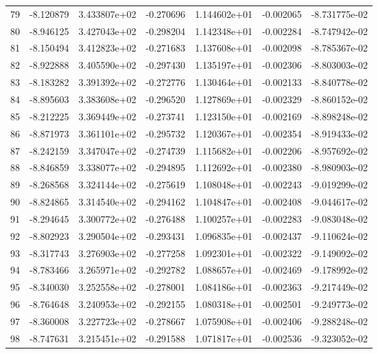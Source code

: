 \begin{tabular}{rrrrrrr}
  79 &  -8.120879 &  3.433807e+02 & -0.270696 &  1.144602e+01 &  -0.002065 & -8.731775e-02 \\
  80 &  -8.946125 &  3.427043e+02 & -0.298204 &  1.142348e+01 &  -0.002284 & -8.747942e-02 \\
  81 &  -8.150494 &  3.412823e+02 & -0.271683 &  1.137608e+01 &  -0.002098 & -8.785367e-02 \\
  82 &  -8.922888 &  3.405590e+02 & -0.297430 &  1.135197e+01 &  -0.002306 & -8.803003e-02 \\
  83 &  -8.183282 &  3.391392e+02 & -0.272776 &  1.130464e+01 &  -0.002133 & -8.840778e-02 \\
  84 &  -8.895603 &  3.383608e+02 & -0.296520 &  1.127869e+01 &  -0.002329 & -8.860152e-02 \\
  85 &  -8.212225 &  3.369449e+02 & -0.273741 &  1.123150e+01 &  -0.002169 & -8.898248e-02 \\
  86 &  -8.871973 &  3.361101e+02 & -0.295732 &  1.120367e+01 &  -0.002354 & -8.919433e-02 \\
  87 &  -8.242159 &  3.347047e+02 & -0.274739 &  1.115682e+01 &  -0.002206 & -8.957692e-02 \\
  88 &  -8.846859 &  3.338077e+02 & -0.294895 &  1.112692e+01 &  -0.002380 & -8.980903e-02 \\
  89 &  -8.268568 &  3.324144e+02 & -0.275619 &  1.108048e+01 &  -0.002243 & -9.019299e-02 \\
  90 &  -8.824865 &  3.314540e+02 & -0.294162 &  1.104847e+01 &  -0.002408 & -9.044617e-02 \\
  91 &  -8.294645 &  3.300772e+02 & -0.276488 &  1.100257e+01 &  -0.002283 & -9.083048e-02 \\
  92 &  -8.802923 &  3.290504e+02 & -0.293431 &  1.096835e+01 &  -0.002437 & -9.110624e-02 \\
  93 &  -8.317743 &  3.276903e+02 & -0.277258 &  1.092301e+01 &  -0.002322 & -9.149092e-02 \\
  94 &  -8.783466 &  3.265971e+02 & -0.292782 &  1.088657e+01 &  -0.002469 & -9.178992e-02 \\
  95 &  -8.340030 &  3.252558e+02 & -0.278001 &  1.084186e+01 &  -0.002363 & -9.217449e-02 \\
  96 &  -8.764648 &  3.240953e+02 & -0.292155 &  1.080318e+01 &  -0.002501 & -9.249773e-02 \\
  97 &  -8.360008 &  3.227723e+02 & -0.278667 &  1.075908e+01 &  -0.002406 & -9.288248e-02 \\
  98 &  -8.747631 &  3.215451e+02 & -0.291588 &  1.071817e+01 &  -0.002536 & -9.323052e-02 \\

\end{tabular}
